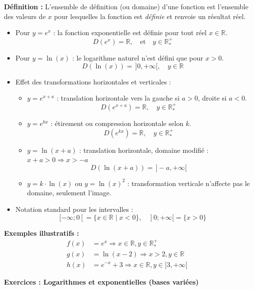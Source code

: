 \documentclass[11pt,a4paper]{article}
\newcommand{\rulebox}[3]{
\begin{tcolorbox}[colback=#1!10!white,colframe=#1!60!black,title=\textbf{#2}]
#3
\end{tcolorbox}
}
\begin{document}
\rulebox{cyan}{Ensembles de définition des fonctions exponentielles et logarithmes}{
\textbf{Définition :} L'ensemble de définition (ou domaine) d'une fonction est l'ensemble des valeurs de $x$ pour lesquelles la fonction est \textit{définie} et renvoie un résultat réel.  

\begin{itemize}
\item Pour $y = e^x$ : la fonction exponentielle est définie pour tout réel $x \in \mathbb{R}$.
\[
D(e^x) = \mathbb{R}, \quad \text{et} \quad y \in \mathbb{R}^+_*
\]
\item Pour $y = \ln(x)$ : le logarithme naturel n'est défini que pour $x>0$.
\[
D(\ln(x)) = \, ]0,+\infty[ , \quad y \in \mathbb{R}
\]
\item Effet des transformations horizontales et verticales :
\begin{itemize}
\item $y = e^{x+a}$ : translation horizontale vers la gauche si $a>0$, droite si $a<0$.  
\[
D(e^{x+a}) = \mathbb{R}, \quad y \in \mathbb{R}^+_*
\]
\item $y = e^{kx}$ : étirement ou compression horizontale selon $k$.  
\[
D(e^{kx}) = \mathbb{R}, \quad y \in \mathbb{R}^+_*
\]
\item $y = \ln(x+a)$ : translation horizontale, domaine modifié : $x+a>0 \Rightarrow x > -a$  
\[
D(\ln(x+a)) = \, ]-a,+\infty[
\]
\item $y = k\cdot \ln(x)$ ou $y = \ln(x)^2$ : transformation verticale n’affecte pas le domaine, seulement l’image.  
\end{itemize}
\item Notation standard pour les intervalles :
\[
[-\infty;0[ = \{ x \in \mathbb{R} \mid x<0\}, \quad ]0;+\infty[ = \{ x>0\}
\]
\end{itemize}

\textbf{Exemples illustratifs :}  
\[
\begin{aligned}
f(x) &= e^x \Rightarrow x \in \mathbb{R}, y \in \mathbb{R}^+_* \\
g(x) &= \ln(x-2) \Rightarrow x>2, y \in \mathbb{R} \\
h(x) &= e^{-x}+3 \Rightarrow x \in \mathbb{R}, y \in ]3,+\infty[
\end{aligned}
\]
}


\newpage

\begin{center}
{\LARGE \textbf{Exercices : Logarithmes et exponentielles (bases variées)}}
\end{center}
\end{document}
